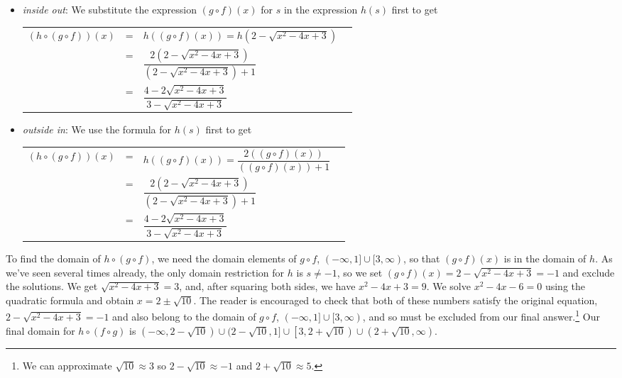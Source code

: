 \begin{ex}
\begin{enumerate}
\begin{itemize}

\item  \textit{inside out}: We substitute the expression $(g \circ f)(x)$ for $s$ in the expression $h(s)$ first to get
\begin{longtable}{rclr} $(h \circ (g \circ f))(x)$ & = & $h((g \circ f)(x))=h\left(2 - \sqrt{x^2-4x+3}\right)$  & \\ [5pt]
 & = & $\dfrac{2 \left(2 - \sqrt{x^2-4x+3}\right)}{\left(2 - \sqrt{x^2-4x+3}\right)+1}$ & \\ [20pt]
 & = & $\dfrac{4 - 2\sqrt{x^2-4x+3}}{3 - \sqrt{x^2-4x+3}}$ & \\
 \end{longtable}

\item  \textit{outside in}:  We use the formula for $h(s)$ first to get
\begin{longtable}{rclr} $(h \circ (g \circ f))(x)$ & = & $h((g \circ f)(x))=\dfrac{2 \left( (g \circ f)(x)\right)}{  \left( (g \circ f)(x)\right) + 1}$  & \\ [15pt]
& = & $\dfrac{2 \left(2 - \sqrt{x^2-4x+3}\right)}{\left(2 - \sqrt{x^2-4x+3}\right)+1}$ & \\ [20pt]
 & = & $\dfrac{4 - 2\sqrt{x^2-4x+3}}{3 - \sqrt{x^2-4x+3}}$ & \\
 \end{longtable}
 
 \end{itemize}
 
To find the domain of $h \circ (g \circ f)$, we need the domain elements of $g \circ f$, $(-\infty, 1] \cup [3,\infty)$, so that $(g \circ f)(x)$ is in the domain of $h$.  As we've seen several times already, the only domain restriction for $h$ is $s \neq -1$, so we set  $(g \circ f)(x) = 2 - \sqrt{x^2-4x+3} = -1$ and exclude the solutions.     We get $\sqrt{x^2-4x+3} = 3$, and, after squaring both sides, we have $x^2-4x+3 = 9$.  We solve $x^2-4x-6 = 0$ using the quadratic formula and obtain $x = 2 \pm \sqrt{10}$.  The reader is encouraged to check that both of these numbers satisfy the original equation, $2 - \sqrt{x^2-4x+3} = -1$ and also belong to the domain of $g \circ f$, $(-\infty, 1] \cup [3,\infty)$, and so must be excluded from our final answer.\footnote{We can approximate $\sqrt{10} \approx 3$ so $2-\sqrt{10} \approx -1$ and $2+\sqrt{10} \approx 5$.}   Our final domain for $h \circ (f \circ g)$ is $(-\infty, 2 -\sqrt{10}) \cup (2 - \sqrt{10}, 1] \cup \left[3, 2 + \sqrt{10}\right) \cup \left(2+\sqrt{10}, \infty\right)$.


\end{enumerate}
\end{ex}

